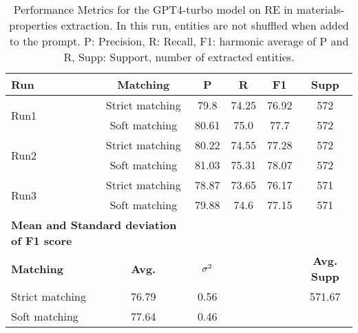 \begin{table}[htbp]
    \small
    \centering
    \caption{Performance Metrics for the GPT4-turbo model on RE in materials-properties extraction. In this run, entities are not shuffled when added to the prompt. P: Precision, R: Recall, F1: harmonic average of P and R, Supp: Support, number of extracted entities.}
    \begin{tabular}{lccccc}
        \toprule
        \textbf{Run} & \textbf{Matching} & \textbf{P} & \textbf{R} & \textbf{F1} & \textbf{Supp} \\
        \midrule
        \multirow{2}{*}{Run1} & Strict matching & 79.8 & 74.25 & 76.92 & 572 \\
        & Soft matching & 80.61 & 75.0 & 77.7 & 572 \\
        \midrule
        \multirow{2}{*}{Run2} & Strict matching & 80.22 & 74.55 & 77.28 & 572 \\
        & Soft matching & 81.03 & 75.31 & 78.07 & 572 \\
        \midrule
        \multirow{2}{*}{Run3} & Strict matching & 78.87 & 73.65 & 76.17 & 571 \\
        & Soft matching & 79.88 & 74.6 & 77.15 & 571 \\
        \midrule
        \multicolumn{2}{l}{\textbf{Mean and Standard deviation of F1 score}} & & & & \\
        \midrule
        \textbf{Matching} & \textbf{Avg.} & $\sigma\textsuperscript{2}$ & & & \textbf{Avg. Supp}\\
        Strict matching & 76.79 & 0.56 & & & 571.67 \\
        Soft matching & 77.64 & 0.46 & & \\
        \bottomrule
    \end{tabular}
\end{table}

